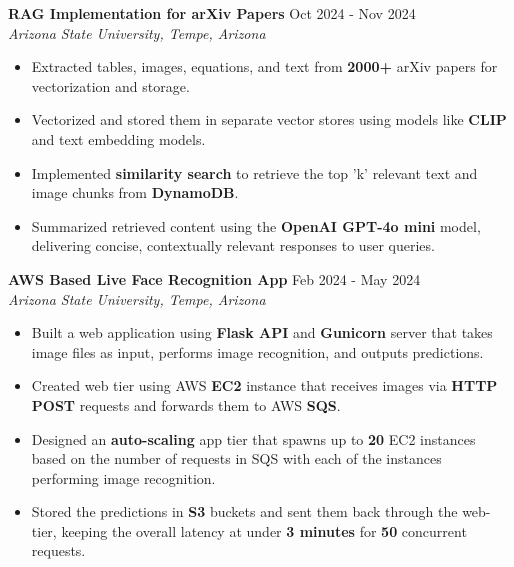 \documentclass[a4paper,9pt]{extarticle}
\begin{document}
\noindent
\textbf{RAG Implementation for arXiv Papers} \hfill Oct 2024 - Nov 2024\\%
\textit{Arizona State University, Tempe, Arizona}
\begin{itemize}
    
    \item Extracted tables, images, equations, and text from \textbf{2000+} arXiv papers for vectorization and storage.
    \item Vectorized and stored them in separate vector stores using models like \textbf{CLIP} and text embedding models.
    \item Implemented \textbf{similarity search} to retrieve the top 'k' relevant text and image chunks from \textbf{DynamoDB}.
    \item Summarized retrieved content using the \textbf{OpenAI GPT-4o mini} model, delivering concise, contextually relevant responses to user queries.
\end{itemize}

\noindent
\textbf{AWS Based Live Face Recognition App}  \hfill Feb 2024 - May 2024\\ %
\textit{Arizona State University, Tempe, Arizona} %
\begin{itemize}
    \item Built a web application using \textbf{Flask API} and \textbf{Gunicorn} server that takes image files as input, performs image recognition, and outputs predictions.
    \item Created web tier using AWS \textbf{EC2} instance that receives images via \textbf{HTTP POST} requests and forwards them to AWS \textbf{SQS}.
    \item Designed an \textbf{auto-scaling} app tier that spawns up to \textbf{20} EC2 instances based on the number of requests in SQS with each of the instances performing image recognition.
    \item Stored the predictions in \textbf{S3} buckets and sent them back through the web-tier, keeping the overall latency at under \textbf{3 minutes} for \textbf{50} concurrent requests.
    
\end{itemize}
\end{document}
